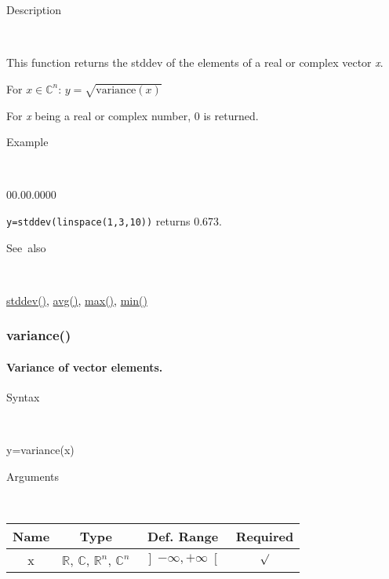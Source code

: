 \begin{description}
\item [Description]~
\end{description}
This function returns the stddev of the elements of a real or complex
vector \textit{x}.

\medskip{}
For $x\in$$\mathbb{C}^{n}$: $y=$$\sqrt{\textrm{variance}(x)}$
\medskip{}

For \textit{x} being a real or complex number, 0 is returned.

\begin{description}
\item [Example]~
\end{description}
\begin{lyxlist}{00.00.0000}
\item [\texttt{y=stddev(linspace(1,3,10))}]returns 0.673.
\end{lyxlist}
\begin{description}
\item [See~also]~
\end{description}
\textcolor{blue}{\hyperlink{stddev}{stddev()}}\textcolor{black}{,}
\textcolor{blue}{\hyperlink{avg}{avg()}}\textcolor{black}{,} \textcolor{blue}{\hyperlink{max}{max()}}\textcolor{black}{,}
\textcolor{blue}{\hyperlink{min}{min()}}


\newpage
\subsubsection*{\hypertarget{variance}{}{\Large variance()}}


\paragraph{\label{par:Variance}Variance of vector elements.}

\begin{description}
\item [Syntax]~
\end{description}
y=variance(x)

\begin{description}
\item [Arguments]~
\end{description}
\begin{tabular}{|c|c|c|c|}
\hline 
Name&
Type&
Def. Range&
Required\tabularnewline
\hline
\hline 
x&
$\mathbb{R}$, $\mathbb{C}$, $\mathbb{R}^{n}$, $\mathbb{C}^{n}$&
$\left]-\infty,+\infty\right[$&
$\surd$\tabularnewline
\hline
\end{tabular}

